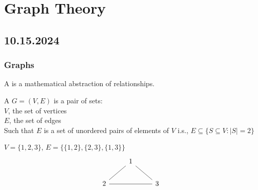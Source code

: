 \documentclass[11pt]{scrartcl}
\begin{document}
\section{Graph Theory}
\subsection{10.15.2024}
\subsubsection{Graphs}
\begin{remark}
    A  is a mathematical abstraction of  relationships.
\end{remark}
\begin{definition}
    A  $G = (V, E)$ is a pair of sets: \\
        $V$, the set of vertices\\
        $E$, the set of edges\\
        Such that $E$ is a set of unordered pairs of elements of $V$ i.s., $E \subseteq\{S \subseteq V: |S| = 2\}$
\end{definition}
\begin{example}
    $V=\{1, 2, 3\}$, $E = \{\{1, 2\}, \{2, 3\}, \{1, 3\}\}$
\[\begin{tikzcd}
	& 1 \\
	2 && 3
	\arrow[no head, from=1-2, to=2-1]
	\arrow[no head, from=2-1, to=2-3]
	\arrow[no head, from=2-3, to=1-2]
\end{tikzcd}\]
\end{example}
\end{document}
